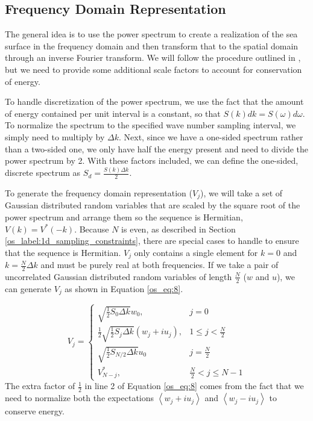 \subsection{Frequency Domain Representation}
The general idea is to use the power spectrum to create a realization of the sea surface in the frequency domain and then transform that to the spatial domain through an inverse Fourier transform. We will follow the procedure outlined in \cite{percival_spectra}, 
but we need to provide some additional scale factors to account for conservation of energy.

To handle discretization of the power spectrum, we use the fact that the amount of energy contained per unit interval is a constant, so that $S(k)dk = S(\omega) d\omega$. To normalize the spectrum to the specified wave number sampling interval, we simply need to multiply by $\Delta k$. Next, since we have a one-sided spectrum rather than a two-sided one, we only have half the energy present and need to divide the power spectrum by 2. With these factors included, we can define the one-sided, discrete spectrum as $S_d = \frac{S(k)\Delta k}{2}$.

To generate the frequency domain representation ($V_j$), we will take a set of Gaussian distributed random variables that are scaled  by the square root of the power spectrum and arrange them so the sequence is Hermitian, $V(k) = V^*(-k)$. Because $N$ is even, as described in Section \ref{os_label:1d_sampling_constraints}, there are special cases to handle to ensure that the sequence is Hermitian. $V_j$ only contains a single element for $k = 0$ and $k = \frac{N}{2}\Delta k$ and must be purely real at both frequencies. If we take a pair of uncorrelated Gaussian distributed random variables of length $\frac{N}{2}$ ($w$ and $u$), we can generate $V_j$ as shown in Equation \ref{os_eq:8}.

\begin{equation}
  \label{os_eq:8}   
  V_j = \begin{cases}
    \sqrt{\frac{1}{2}S_0\Delta k}w_0, & j = 0 \\
    \frac{1}{2}\sqrt{\frac{1}{2}S_j\Delta k}\left(w_j + iu_j \right), & 1 \leq j < \frac{N}{2} \\
   \sqrt{\frac{1}{2}S_{N/2}\Delta k}u_0 & j = \frac{N}{2} \\
    V_{N-j}^*, &  \frac{N}{2} < j \leq N-1 
  \end{cases} 
\end{equation}
The extra factor of $\frac{1}{2}$ in line 2 of Equation \ref{os_eq:8} comes from the fact that we need to normalize both the expectations $\left<w_j + iu_j\right>$ and $\left<w_j - iu_j\right>$ to conserve energy.

